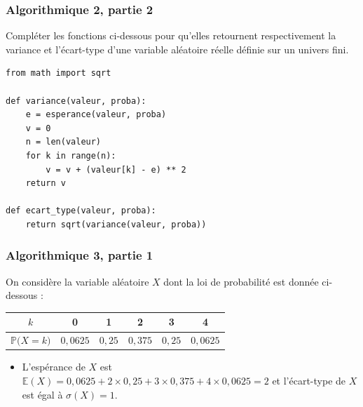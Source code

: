 \documentclass[11pt, hyperref={urlcolor=red,%
            linkcolor=blue, %
            colorlinks=true}]{beamer}
\newcommand{\proba}[1]{\mathbb{P}\big(#1\big)}
\newcommand{\esperance}[1]{\mathbb{E}\left(#1\right)}
\newcommand{\ecart}[1]{\sigma\left(#1\right)}
\begin{document}
\begin{frame}[fragile]

\frametitle{Algorithmique 2,  partie 2}

Compléter les fonctions ci-dessous pour qu'elles retournent respectivement  la variance et l'écart-type d'une variable aléatoire réelle définie sur un univers fini.

\begin{lstlisting}[style=rond]
from math import sqrt

def variance(valeur, proba):
    e = esperance(valeur, proba)
    v = 0
    n = len(valeur)
    for k in range(n):
        v = v + (valeur[k] - e) ** 2
    return v

def ecart_type(valeur, proba):
    return sqrt(variance(valeur, proba))
\end{lstlisting}


\end{frame}




\begin{frame}[fragile]

\label{algo3}
\frametitle{Algorithmique 3,  partie 1}

On considère la variable aléatoire $X$ dont la loi de probabilité est donnée ci-dessous :
	
	\begin{center}
\begin{tabular}{|c|c|c|c|c|c|}
\hline 
$k$ & 0 & 1 & 2 & 3 & 4 \\ 
\hline 
$\proba{X=k}$ & $0,0625$ & $0,25$ & $0,375$ & $0,25$ & $0,0625$ \\ 
\hline 
\end{tabular} 
	\end{center}
	
\begin{itemize} 
\pause \item L'espérance de $X$ est $\esperance{X}=0,0625 + 2 \times 0,25 + 3 \times 0,375 + 4 \times 0,0625  =2  $ et l'écart-type de $X$ est égal à $\ecart{X}=1$.

\end{itemize}


\end{frame}
\end{document}
